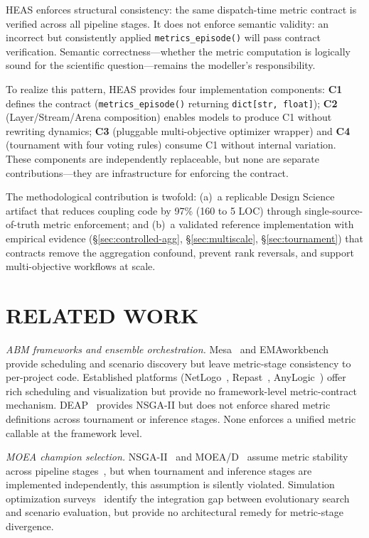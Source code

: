 \documentclass{wscpaperproc}
\begin{document}
HEAS enforces structural consistency: the same dispatch-time metric contract is
verified across all pipeline stages. It does not enforce semantic validity: an
incorrect but consistently applied \texttt{metrics\_episode()} will pass contract
verification. Semantic correctness---whether the metric computation is logically
sound for the scientific question---remains the modeller's responsibility.

To realize this pattern, HEAS provides four implementation components:
\textbf{C1} defines the contract (\texttt{metrics\_episode()} returning
\texttt{dict[str, float]}); \textbf{C2} (Layer/Stream/Arena composition) enables
models to produce C1 without rewriting dynamics; \textbf{C3} (pluggable multi-objective
optimizer wrapper) and \textbf{C4} (tournament with four voting rules) consume C1
without internal variation. These components are independently replaceable, but none
are separate contributions---they are infrastructure for enforcing the contract.

The methodological contribution is twofold: (a)~a replicable Design Science
artifact that reduces coupling code by 97\% (160 to 5 LOC) through
single-source-of-truth metric enforcement; and (b)~a validated reference
implementation with empirical evidence (\S\ref{sec:controlled-agg},
\S\ref{sec:multiscale}, \S\ref{sec:tournament}) that contracts remove the
aggregation confound, prevent rank reversals, and support multi-objective
workflows at scale.

\section{RELATED WORK}

\textit{ABM frameworks and ensemble orchestration.}
Mesa~\cite{kazil2020mesa} and EMAworkbench~\cite{kwakkel2017workbench} provide
scheduling and scenario discovery but leave metric-stage consistency to
per-project code. Established platforms (NetLogo~\cite{wilensky1999netlogo},
Repast~\cite{collier2022repast4py}, AnyLogic~\cite{borshchev2013anylogic})
offer rich scheduling and visualization but provide no framework-level
metric-contract mechanism. DEAP~\cite{fortin2012deap} provides NSGA-II but does not
enforce shared metric definitions across tournament or inference stages. None
enforces a unified metric callable at the framework level.

\textit{MOEA champion selection.}
NSGA-II~\cite{deb2002nsga2} and MOEA/D~\cite{zhang2007moead} assume metric
stability across pipeline stages~\cite{fu2002optimization}, but when tournament
and inference stages are implemented independently, this assumption is silently
violated. Simulation optimization surveys~\cite{andradottir2015overview,tekin2004simulation}
identify the integration gap between evolutionary search and scenario evaluation,
but provide no architectural remedy for metric-stage divergence.
\end{document}

